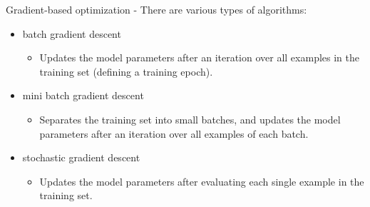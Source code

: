 \begin{frame}[t,allowframebreaks]{Gradient-based optimization -}
    There are various types of 
    algorithms:\\
    \begin{itemize}
        \item   
            \Gls{batch gradient descent}\\
            \begin{itemize}
                \item
                    Updates the model parameters 
                    after an iteration over all examples in the training set
                    (defining a training \gls{epoch}).
            \end{itemize}
        \item 
            \Gls{mini batch gradient descent}\\
            \begin{itemize}
                \item   
                    Separates the training set into small batches,
                    and updates the model parameters after an iteration
                    over all examples of each batch.
            \end{itemize}
        \item 
            \Gls{stochastic gradient descent}\\
            \begin{itemize}
                \item   
                    Updates the model parameters after evaluating each
                    single example in the training set.
            \end{itemize}
    \end{itemize}

    \framebreak



\end{frame}
